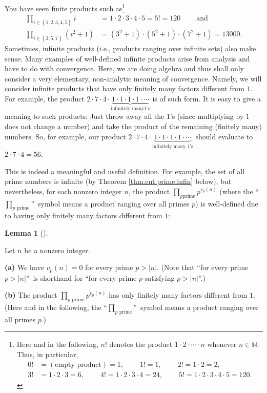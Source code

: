 \documentclass[numbers=enddot,12pt,final,onecolumn,notitlepage]{scrartcl}%
\numberwithin{exer}{subsection}
\theoremstyle{definition}
\newtheorem{lem}[theo]{Lemma}
\newenvironment{lemma}[1][]
{\begin{lem}[#1]\begin{leftbar}}
{\end{leftbar}\end{lem}}
\let\prodnonlimits\prod
\renewcommand{\prod}{\prodnonlimits\limits}
\begin{document}
You have seen finite products such as\footnote{Here and in the following, $n!$
denotes the product $1\cdot2\cdot\cdots\cdot n$ whenever $n\in\mathbb{N}$.
Thus, in particular,
\begin{align*}
0!  &  =\left(  \text{empty product}\right)
=1,\ \ \ \ \ \ \ \ \ \ 1!=1,\ \ \ \ \ \ \ \ \ \ 2!=1\cdot2=2,\\
3!  &  =1\cdot2\cdot3=6,\ \ \ \ \ \ \ \ \ \ 4!=1\cdot2\cdot3\cdot
4=24,\ \ \ \ \ \ \ \ \ \ 5!=1\cdot2\cdot3\cdot4\cdot5=120.
\end{align*}
}
\begin{align*}
\prod_{i\in\left\{  1,2,3,4,5\right\}  }i  &  =1\cdot2\cdot3\cdot
4\cdot5=5!=120\ \ \ \ \ \ \ \ \ \ \text{and}\\
\prod_{i\in\left\{  3,5,7\right\}  }\left(  i^{2}+1\right)   &  =\left(
3^{2}+1\right)  \cdot\left(  5^{2}+1\right)  \cdot\left(  7^{2}+1\right)
=13000.
\end{align*}
Sometimes, infinite products (i.e., products ranging over infinite sets) also
make sense. Many examples of well-defined infinite products arise from
analysis and have to do with convergence. Here, we are doing algebra and thus
shall only consider a very elementary, non-analytic meaning of convergence.
Namely, we will consider infinite products that have only finitely many
factors different from $1$. For example, the product $2\cdot7\cdot
4\cdot\underbrace{1\cdot1\cdot1\cdot1\cdot\cdots}_{\text{infinitely many
}1\text{'s}}$ is of such form. It is easy to give a meaning to such products:
Just throw away all the $1$'s (since multiplying by $1$ does not change a
number) and take the product of the remaining (finitely many) numbers. So, for
example, our product $2\cdot7\cdot4\cdot\underbrace{1\cdot1\cdot1\cdot
1\cdot\cdots}_{\text{infinitely many }1\text{'s}}$ should evaluate to
$2\cdot7\cdot4=56$.

This is indeed a meaningful and useful definition. For example, the set of all
prime numbers is infinite (by Theorem \ref{thm.ent.prime.infin} below), but
nevertheless, for each nonzero integer $n$, the product $\prod_{p\text{
prime}}p^{v_{p}\left(  n\right)  }$ (where the \textquotedblleft%
$\prod_{p\text{ prime}}$\textquotedblright\ symbol means a product ranging
over all primes $p$) is well-defined due to having only finitely many factors
different from $1$:

\begin{lemma}
\label{lem.ent.prime.vpn=0}Let $n$ be a nonzero integer.

\textbf{(a)} We have $v_{p}\left(  n\right)  =0$ for every prime $p>\left\vert
n\right\vert $. (Note that \textquotedblleft for every prime $p>\left\vert
n\right\vert $\textquotedblright\ is shorthand for \textquotedblleft for every
prime $p$ satisfying $p>\left\vert n\right\vert $\textquotedblright.)

\textbf{(b)} The product $\prod_{p\text{ prime}}p^{v_{p}\left(  n\right)  }$
has only finitely many factors different from $1$. (Here and in the following,
the \textquotedblleft$\prod_{p\text{ prime}}$\textquotedblright\ symbol means
a product ranging over all primes $p$.)
\end{lemma}
\end{document}
